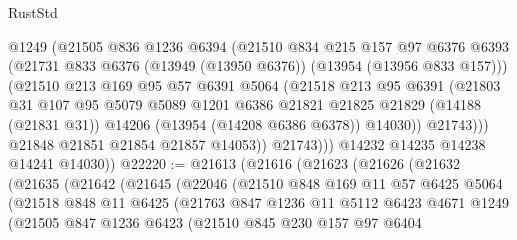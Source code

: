 \begin{lexlean}{RustStd}
\begin{coremodule}
                  @1249
                  (@21505
                    @836
                    @1236
                    @6394
                    (@21510
                      @834
                      @215
                      @157
                      @97
                      @6376
                      @6393
                      (@21731 @833 @6376 (@13949 (@13950 @6376)) (@13954 (@13956 @833 @157)))
                      (@21510
                        @213
                        @169
                        @95
                        @57
                        @6391
                        @5064
                        (@21518
                          @213
                          @95
                          @6391
                          (@21803
                            @31
                            @107
                            @95
                            @5079
                            @5089
                            @1201
                            @6386
                            @21821
                            @21825
                            @21829
                            (@14188 (@21831 @31))
                            @14206
                            (@13954 (@14208 @6386 @6378))
                            @14030))
                        @21743)))
                  @21848
                  @21851
                  @21854
                  @21857
                  @14053))
              @21743)))
        @14232
        @14235
        @14238
        @14241
        @14030))
@22220 := @21613
    (@21616
      (@21623
        (@21626
          (@21632
            (@21635
              (@21642
                (@21645
                  (@22046
                    (@21510
                      @848
                      @169
                      @11
                      @57
                      @6425
                      @5064
                      (@21518
                        @848
                        @11
                        @6425
                        (@21763
                          @847
                          @1236
                          @11
                          @5112
                          @6423
                          @4671
                          @1249
                          (@21505
                            @847
                            @1236
                            @6423
                            (@21510
                              @845
                              @230
                              @157
                              @97
                              @6404

\end{coremodule}
\end{lexlean}
